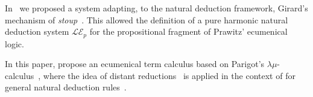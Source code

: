 In~\cite{DBLP:journals/corr/abs-2204-02199} we proposed a system adapting, to the natural deduction framework,  Girard's mechanism of \textit{stoup}~\cite{DBLP:journals/mscs/Girard91}.  This allowed the definition of a pure harmonic natural deduction system $\mathcal{LE}_{p}$ for the propositional fragment of  Prawitz' ecumenical logic. 

In this paper, propose an ecumenical term calculus based on Parigot's $\lambda\mu$-calculus~\cite{parigot92lpar}, where the idea of distant reductions~\cite{DBLP:conf/fossacs/SantoKP22} is applied in the context of for general natural deduction rules~\cite{DBLP:journals/aml/Plato01a}.


